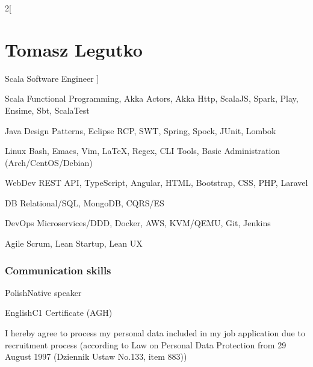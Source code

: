 \documentclass{tccv}
\begin{document}
\begin{multicols}{2}[
\part{Tomasz Legutko}{Scala Software Engineer}
]
\begin{factlist}

\item{Scala}
     {Functional Programming, Akka Actors, Akka Http, ScalaJS, Spark, Play, Ensime, Sbt, ScalaTest} 

\item{Java}
     {Design Patterns, Eclipse RCP, SWT, Spring, Spock, JUnit, Lombok}

\item{Linux}
     {Bash, Emacs, Vim, \LaTeX, Regex, CLI Tools, Basic Administration (Arch/CentOS/Debian)}
     
\item{WebDev}
     {REST API, TypeScript, Angular, HTML, Bootstrap, CSS, PHP, Laravel}

\item{DB}
  {Relational/SQL, MongoDB, CQRS/ES}

\item{DevOps}
     {Microservices/DDD, Docker, AWS, KVM/QEMU, Git, Jenkins}

\item{Agile}
     {Scrum, Lean Startup, Lean UX}

\end{factlist}

\section{Communication skills}

\begin{factlist}
\item{Polish}{Native speaker}
\item{English}{C1 Certificate (AGH)}
\end{factlist}

\end{multicols}

I hereby agree to process my personal data included in my job application due to recruitment process
(according to Law on Personal Data Protection from 29 August 1997 (Dziennik Ustaw No.133, item 883))
\end{document}
